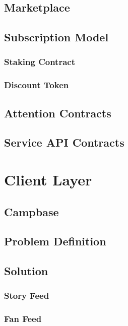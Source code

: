 \documentclass[letterpaper,11pt]{article}
\begin{document}
\subsection{Marketplace}

\subsection{Subscription Model}

\subsubsection{Staking Contract}

\subsubsection{Discount Token}

\subsection{Attention Contracts}

\subsection{Service API Contracts}

\section{Client Layer}

\subsection{Campbase}

\subsection{Problem Definition}

\subsection{Solution}

\subsubsection{Story Feed}

\subsubsection{Fan Feed}
\end{document}
